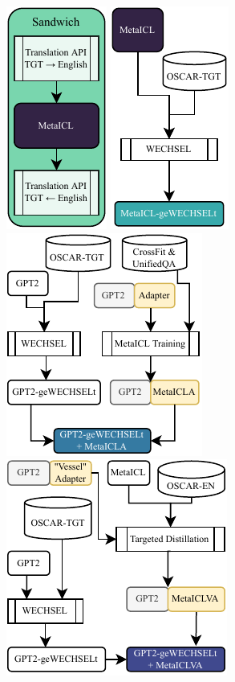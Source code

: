 \documentclass[11pt]{article}
\begin{document}
\begin{figure}[ht]
	\subcaptionbox{\label{fig:sandwich}}
	{\includegraphics{sandwich.pdf}}
	\hfill
	\subcaptionbox{\label{fig:metaicl-gewechselt}}
	{\includegraphics{metaicl-gewechselt.pdf}}
	\hfill
	\subcaptionbox{}
	{\includegraphics{gpt2-gewechselt+metaicla.pdf}}
	\hfill
	\subcaptionbox{}
	{\includegraphics{gpt2-gewechselt+metaiclva.pdf}}

\end{figure}
\end{document}

